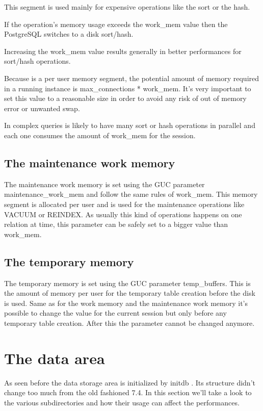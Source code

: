 This segment is used mainly for expensive operations like the sort or the 
hash.

If the operation's memory usage exceeds the work\_mem value then the PostgreSQL 
switches to a disk sort/hash. 

Increasing the work\_mem value results generally in better performances for 
sort/hash operations. 

Because is a per user memory segment, the potential amount of memory 
required in a running instance is max\_connections * work\_mem. It's very 
important to set this value to a reasonable size in order to avoid any risk of 
out of memory error or unwanted swap.

In complex queries is likely to have many sort or hash operations in parallel 
and each one consumes the amount of work\_mem for the 
session.


\subsection{The maintenance work memory}
The maintenance work memory is set using the GUC parameter 
maintenance\_work\_mem and follow the same rules of work\_mem. This memory 
segment is allocated per user and is used for the maintenance operations 
like VACUUM or REINDEX. As usually this kind of operations happens on one 
relation at time, this parameter can be safely set to a bigger value than 
work\_mem.

\subsection{The temporary memory}
\label{sub:TEMPBUF}
The temporary memory is set using the GUC parameter temp\_buffers. This is the 
amount of memory per user for the temporary table creation before the disk is 
used. Same as for the work memory and the maintenance work memory it's possible 
to change the value for the current session but only before any temporary table 
creation. After this the parameter cannot be changed anymore.


\section{The data area}
\label{sec:PGDATA}
As seen before the data storage area is initialized by initdb .
Its structure didn't change too much from the old fashioned 7.4.
In this section we'll take a look to the various subdirectories and how their 
usage can affect the performances. 


